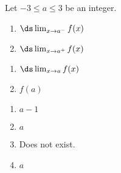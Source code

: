 {
\noindent\begin{minipage}{\linewidth}\centering
{}
\end{minipage}

Let $-3\leq a\leq 3$ be an integer.

\noindent\begin{minipage}[t]{.49\linewidth}
\begin{enumerate}
\item		$\ds \lim_{x\to a^-} f(x)$
\item		$\ds \lim_{x\to a^+} f(x)$
\end{enumerate}
\end{minipage}
\noindent\begin{minipage}[t]{.49\linewidth}
\begin{enumerate}\addtocounter{enumii}{2}
\item		$\ds \lim_{x\to a} f(x)$
\item		$f(a)$\end{enumerate}
\end{minipage}
}
{\begin{enumerate}
\item		$a-1$
\item		$a$
\item		Does not exist.
\item		$a$
\end{enumerate}
}


